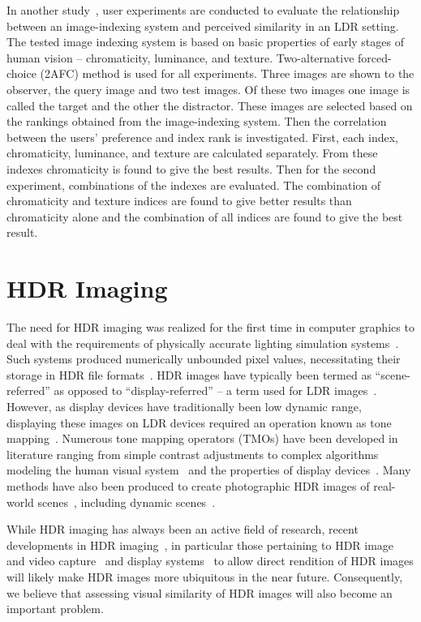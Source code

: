 In another study~\cite{neumann2006image}, user experiments are conducted to evaluate the relationship between an image-indexing system and perceived similarity in an LDR setting. The tested image indexing system is based on basic properties of early stages of human vision -- chromaticity, luminance, and texture. Two-alternative forced-choice (2AFC) method is used for all experiments. Three images are shown to the observer, the query image and two test images. Of these two images one image is called the target and the other the distractor. These images are selected based on the rankings obtained from the image-indexing system. Then the correlation between the users' preference and index rank is investigated. First, each index, chromaticity, luminance, and texture are calculated separately. From these indexes chromaticity is found to give the best results. Then for the second experiment, combinations of the indexes are evaluated. The combination of chromaticity and texture indices are found to give better results than chromaticity alone and the combination of all indices are found to give the best result.

\section{HDR Imaging}
The need for HDR imaging was realized for the first time in computer graphics to deal with the requirements of physically accurate lighting simulation systems~\cite{glassner1995principles}. Such systems produced numerically unbounded pixel values, necessitating their storage in HDR file formats~\cite{ward1998rendering}. HDR images have typically been termed as ``scene-referred'' as opposed to ``display-referred'' -- a term used for LDR images~\cite{Rein2010}. However, as display devices have traditionally been low dynamic range, displaying these images on LDR devices required an operation known as tone mapping~\cite{Tumb93,Ward97}. Numerous tone mapping operators (TMOs) have been developed in literature ranging from simple contrast adjustments to complex algorithms modeling the human visual system~\cite{Ferw96} and the properties of display devices~\cite{Mantiuk2008}. Many methods have also been produced to create photographic HDR images of real-world scenes~\cite{Debe97}, including dynamic scenes~\cite{sen2012robust,kalantari2017deep}.

While HDR imaging has always been an active field of research, recent developments in HDR imaging~\cite{Rein2010,Banterle2011,chalmers2016high}, in particular those pertaining to HDR image and video capture~\cite{tocci2011versatile,froehlich2014creating} and display systems~\cite{seetzen2004high} to allow direct rendition of HDR images will likely make HDR images more ubiquitous in the near future. Consequently, we believe that assessing visual similarity of HDR images will also become an important problem.

